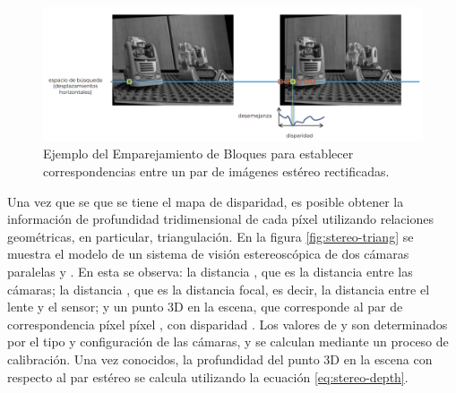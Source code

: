 \begin{figure}[H]
    \centering
    \includegraphics[scale=0.4]{partes/img/block-matching.png}
    \caption[Ejemplo del Emparejamiento de Bloques para establecer correspondencias entre un par de imágenes estéreo rectificadas.]{Ejemplo del Emparejamiento de Bloques para establecer correspondencias entre un par de imágenes estéreo rectificadas\footnotemark.} 
    \label{fig:stereo-block-matching}
\end{figure}

Una vez que se que se tiene el mapa de disparidad, es posible obtener la información de profundidad tridimensional de cada píxel utilizando relaciones geométricas, en particular, triangulación. En la figura \ref{fig:stereo-triang} se muestra el modelo de un sistema de visión estereoscópica de dos cámaras paralelas  y . En esta se observa: la distancia , que es la distancia entre las cámaras; la distancia , que es la distancia focal, es decir, la distancia entre el lente y el sensor; y un punto 3D en la escena, que corresponde al par de correspondencia píxel píxel ,  con disparidad . Los valores de  y  son determinados por el tipo y configuración de las cámaras, y se calculan mediante un proceso de calibración. Una vez conocidos, la profundidad  del punto 3D en la escena con respecto al par estéreo se calcula utilizando la ecuación \ref{eq:stereo-depth}. 

